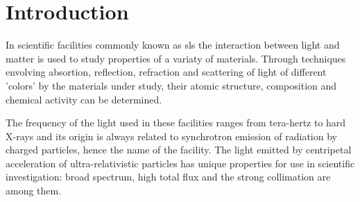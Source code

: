 
% 




% 


	\frenchspacing

	\pretextual
	

	\textual

\chapter{Introduction} \label{chap:intro}

	In scientific facilities commonly known as \gls{sls} the interaction between light and matter is used to study properties of a variaty of materials. Through techniques envolving absortion, reflection, refraction and scattering of light of different 'colors' by the materials under study, their atomic structure, composition and chemical activity can be determined.

  	The frequency of the light used in these facilities ranges from tera-hertz to hard X-rays and its origin is always related to synchrotron emission of radiation by charged particles, hence the name of the facility. The light emitted by centripetal acceleration of ultra-relativistic particles has unique properties for use in scientific investigation: broad spectrum, high total flux and the strong collimation are among them.

